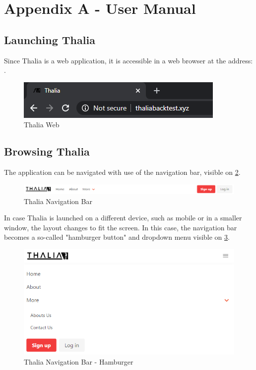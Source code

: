 \documentclass[main.tex]{subfiles}
\begin{document}
\section{Appendix A - User Manual}
\label{user_manual}

\subsection{Launching Thalia}
Since Thalia is a web application, it is accessible in a web browser at the address: .

\begin{figure}[H]
   \centering
   \includegraphics[scale=0.8]{08Appendices/081User/081Pictures/thalia_domain.png}
   \caption{Thalia Web}
   \label{thalia_web}
\end{figure}

\subsection{Browsing Thalia}

The application can be navigated with use of the navigation bar, visible on \figurename{\ref{thalia_navbar}}.

\begin{figure}[H]
   \centering
   \includegraphics[width=\textwidth]{08Appendices/081User/081Pictures/navbar.png}
   \caption{Thalia Navigation Bar}
   \label{thalia_navbar}
\end{figure}

In case Thalia is launched on a different device, such as mobile or in a smaller window, the layout changes to fit the screen. In this case, the navigation bar becomes a so-called "hamburger button" and dropdown menu visible on \figurename{\ref{thalia_navbar_hamburger}}.

\begin{figure}[H]
   \centering
   \includegraphics[width=\textwidth]{08Appendices/081User/081Pictures/navbar_hamburger.png}
   \caption{Thalia Navigation Bar - Hamburger}
   \label{thalia_navbar_hamburger}
\end{figure}
\end{document}
